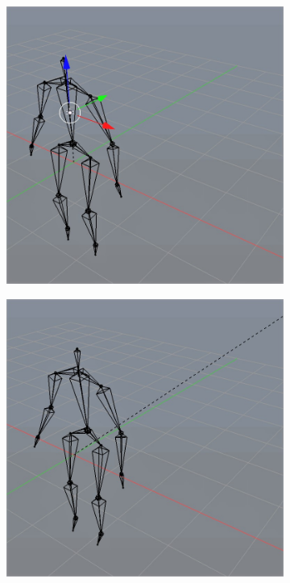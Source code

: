 \documentclass[10pt,twocolumn,letterpaper]{article}
\begin{document}
\begin{figure}
    \begin{subfigure}{0.2\textwidth}
        \centering
        \includegraphics[width=.9\linewidth]{linear-cannon-0.jpg}
    \end{subfigure}\begin{subfigure}{0.2\textwidth}
        \centering
        \includegraphics[width=.9\linewidth]{capped-cannon-5.jpg}
    \end{subfigure}\begin{subfigure}{0.2\textwidth}

\end{subfigure}
\end{figure}
\end{document}
